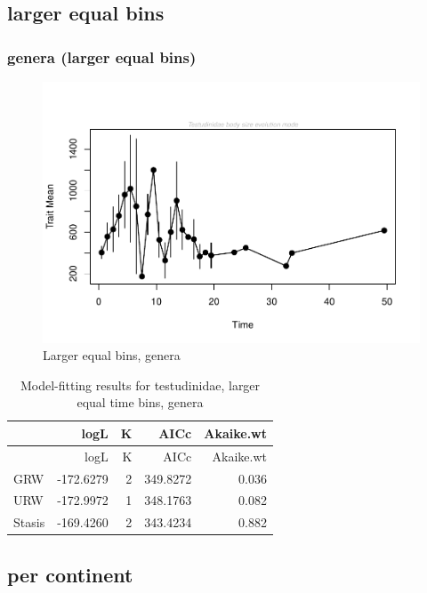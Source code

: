 \documentclass[]{article}
\begin{document}
\newpage

\subsection{larger equal bins}\label{larger-equal-bins}

\subsubsection{genera (larger equal
bins)}\label{genera-larger-equal-bins}

\begin{figure}[htbp]
\centering
\includegraphics{MA_JJ_files/figure-latex/Play around with larger time bins, generic level-1.pdf}
\caption{Larger equal bins, genera}
\end{figure}

\begin{longtable}[]{@{}lrrrr@{}}
\caption{Model-fitting results for testudinidae, larger equal time bins,
genera}\tabularnewline
\toprule
& logL & K & AICc & Akaike.wt\tabularnewline
\midrule
\endfirsthead
\toprule
& logL & K & AICc & Akaike.wt\tabularnewline
\midrule
\endhead
GRW & -172.6279 & 2 & 349.8272 & 0.036\tabularnewline
URW & -172.9972 & 1 & 348.1763 & 0.082\tabularnewline
Stasis & -169.4260 & 2 & 343.4234 & 0.882\tabularnewline
\bottomrule
\end{longtable}

\newpage

\subsection{per continent}\label{per-continent}
\end{document}
